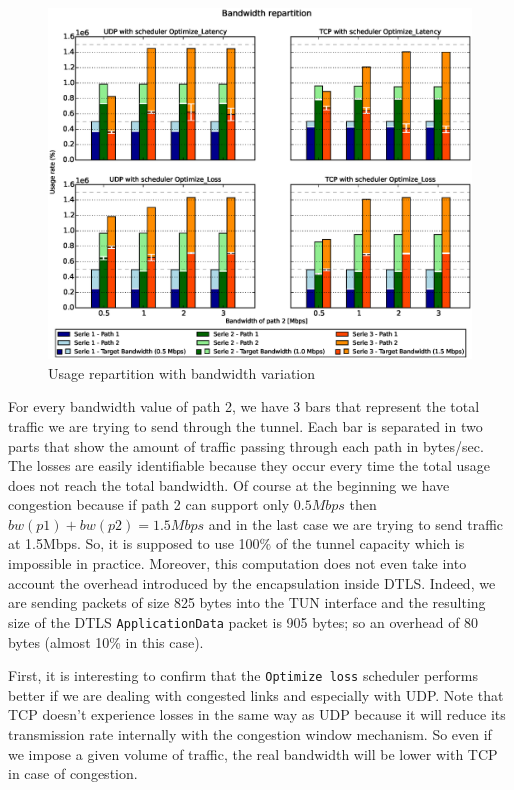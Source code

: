 \begin{figure}[!ht]
\centering
\includegraphics[width=\textwidth]{images/xp/graph1.eps}
\caption{Usage repartition with bandwidth variation}
\label{fig:dynbw}
\end{figure}


For every bandwidth value of path 2, we have 3 bars that represent the total traffic we are trying to send through the tunnel. Each bar is separated in two parts that show the amount of traffic passing through each path in bytes/sec. The losses are easily identifiable because they occur every time the total usage does not reach the total bandwidth. Of course at the beginning we have congestion because if path 2 can support only $0.5Mbps$ then $bw(p1) + bw(p2) = 1.5Mbps$ and in the last case we are trying to send traffic at 1.5Mbps. So, it is supposed to use 100\% of the tunnel capacity which is impossible in practice. Moreover, this computation does not even take into account the overhead introduced by the encapsulation inside DTLS. Indeed, we are sending packets of size 825 bytes into the TUN interface and the resulting size of the DTLS \texttt{ApplicationData} packet is 905 bytes; so an overhead of 80 bytes (almost 10\% in this case).

First, it is interesting to confirm that the \texttt{Optimize loss} scheduler performs better if we are dealing with congested links and especially with UDP. Note that TCP doesn't experience losses in the same way as UDP because it will reduce its transmission rate internally with the congestion window mechanism. So even if we impose a given volume of traffic, the real bandwidth will be lower with TCP in case of congestion.

